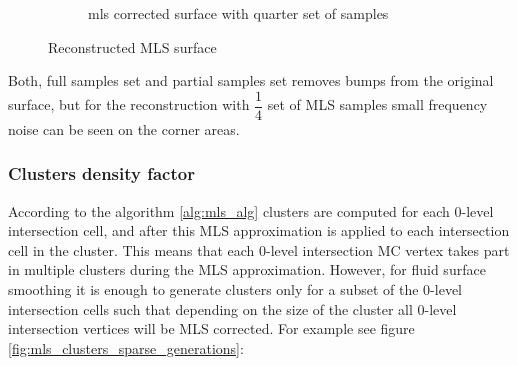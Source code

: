 \begin{figure}
\begin{center}
\begin{subfigure}[b]{\textwidth}
			\caption{mls corrected surface with quarter set of samples}
		\end{subfigure}
	\end{center}
	\caption{Reconstructed MLS surface} \label{fig:surface_sampling_results}
\end{figure}
Both, full samples set and partial samples set removes bumps from the original surface, but for the reconstruction with $\dfrac{1}{4}$ set of MLS samples small frequency noise can be seen on the corner areas.\\

\subsubsection{Clusters density factor} \label{sec:clusterDencityFactor}
According to the algorithm \ref{alg:mls_alg} clusters are computed for each 0-level intersection cell, and after this MLS approximation is applied to each intersection cell in the cluster. This means that each 0-level intersection MC vertex takes part in multiple clusters during the MLS approximation. However, for fluid surface smoothing it is enough to generate clusters only for a subset of the 0-level intersection cells such that depending on the size of the cluster all 0-level intersection vertices will be MLS corrected. For example see figure \ref{fig:mls_clusters_sparse_generations}:
